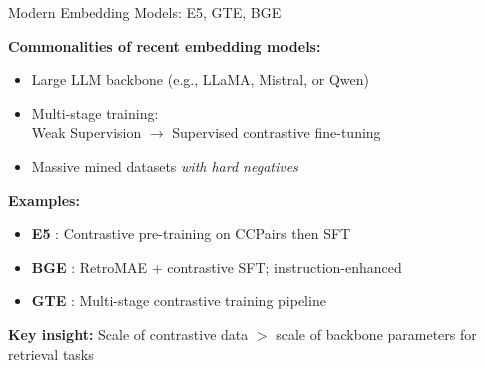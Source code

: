 \documentclass[11pt,compress,t,notes=noshow, xcolor=table]{beamer}
\begin{document}
\begin{frame}{Modern Embedding Models: E5, GTE, BGE}

\vfill

\textbf{Commonalities of recent embedding models:}
\begin{itemize}
  \item Large LLM backbone (e.g., LLaMA, Mistral, or Qwen)
  \item Multi-stage training:\\ Weak Supervision $\to$ Supervised contrastive fine-tuning
  \item Massive mined datasets \textit{with hard negatives}
\end{itemize}

\vfill

\textbf{Examples:}
\begin{itemize}
	\item \textbf{E5} : Contrastive pre-training on CCPairs then SFT
	\item \textbf{BGE} : RetroMAE + contrastive SFT; instruction-enhanced
	\item \textbf{GTE} : Multi-stage contrastive training pipeline
\end{itemize}

\vfill

\textbf{Key insight:} Scale of contrastive data $>$ scale of backbone parameters for retrieval tasks

\vfill

\end{frame}

\end{document}
